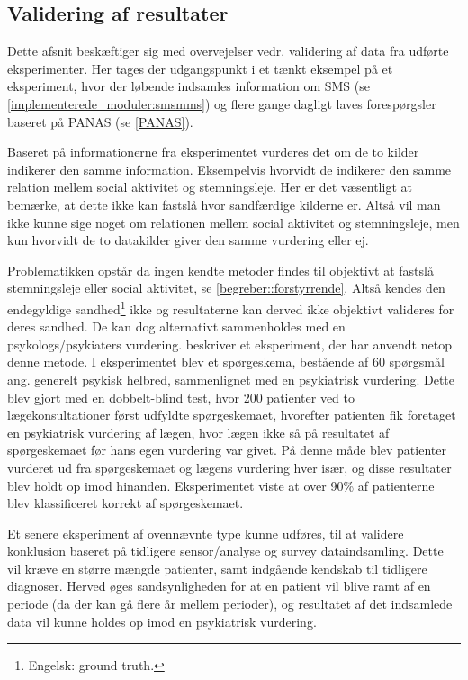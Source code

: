 \subsection{Validering af resultater}\label{reflection:valid_resultater}
Dette afsnit beskæftiger sig med overvejelser vedr. validering af data fra udførte eksperimenter.
Her tages der udgangspunkt i et tænkt eksempel på et eksperiment, hvor der løbende indsamles information om SMS (se \cref{implementerede_moduler:smsmms}) og flere gange dagligt laves forespørgsler baseret på PANAS (se \cref{PANAS}).

Baseret på informationerne fra eksperimentet vurderes det om de to kilder indikerer den samme information.
Eksempelvis hvorvidt de indikerer den samme relation mellem social aktivitet og stemningsleje.
Her er det væsentligt at bemærke, at dette ikke kan fastslå hvor sandfærdige kilderne er.
Altså vil man ikke kunne sige noget om relationen mellem social aktivitet og stemningsleje, men kun hvorvidt de to datakilder giver den samme vurdering eller ej.

Problematikken opstår da ingen kendte metoder findes til objektivt at fastslå stemningsleje eller social aktivitet, se \cref{begreber::forstyrrende}.
Altså kendes den endegyldige sandhed\footnote{Engelsk: ground truth.} ikke og resultaterne kan derved ikke objektivt valideres for deres sandhed.
De kan dog alternativt sammenholdes med en psykologs/psykiaters vurdering.
 beskriver et eksperiment, der har anvendt netop denne metode.
I eksperimentet blev et spørgeskema, bestående af 60 spørgsmål ang. generelt psykisk helbred, sammenlignet med en psykiatrisk vurdering.
Dette blev gjort med en dobbelt-blind test, hvor 200 patienter ved to lægekonsultationer først udfyldte spørgeskemaet, hvorefter patienten fik foretaget en psykiatrisk vurdering af lægen, hvor lægen ikke så på resultatet af spørgeskemaet før hans egen vurdering var givet.
På denne måde blev patienter vurderet ud fra spørgeskemaet og lægens vurdering hver især, og disse resultater blev holdt op imod hinanden.
Eksperimentet viste at over 90\% af patienterne blev klassificeret korrekt af spørgeskemaet.

Et senere eksperiment af ovennævnte type kunne udføres, til at validere konklusion baseret på tidligere sensor/analyse og survey dataindsamling.
Dette vil kræve en større mængde patienter, samt indgående kendskab til tidligere diagnoser.
Herved øges sandsynligheden for at en patient vil blive ramt af en periode (da der kan gå flere år mellem perioder), og resultatet af det indsamlede data vil kunne holdes op imod en psykiatrisk vurdering.


